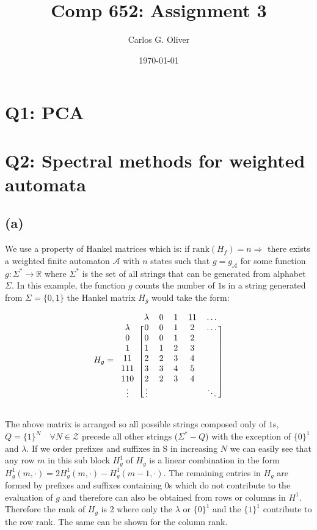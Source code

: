 \documentclass[11pt]{amsart}
\title{Comp 652: Assignment 3}
\author{Carlos G. Oliver}
\date{\today}                                           %
\begin{document}
\maketitle

\section{Q1: PCA}

\section{Q2: Spectral methods for weighted automata}
\subsection{(a)}

We use a property of Hankel matrices which is: if $\text{rank}(H_f) = n \Rightarrow$ there exists a weighted finite automaton $\mathcal{A}$  with $n$ states such that $g = g_{\mathcal{A}}$ for some function $g : \Sigma^{*} \rightarrow \mathbb{R}$ where $\Sigma^{*}$ is the set of all strings that can be generated from alphabet $\Sigma$. In this example, the function $g$ counts the number of $1$s in a string generated from $\Sigma = \{0, 1\}$ the Hankel matrix $H_g$ would take the form: 


 
\[
H_g = \begin{blockarray}{cccccc}
\def\ra{\color{red}\ba}
 & \lambda & 0 & 1 & 11 & \hdots \\
\begin{block}{c[ccccc]}
  \lambda & 0 & 0 & 1 & 2 & \hdots \\
  0 & 0 & 0 & 1 & 2 &  \\
  1 & 1 & 1 & 2 & 3 &  \\
  11 & 2 & 2 & 3 & 4 &  \\
  111 & 3 & 3 & 4 & 5 &  \\
  110 & 2 & 2 & 3 & 4 &  \\
  \vdots & \vdots &  &  &  & \ddots \\
\end{block}
\end{blockarray}
\label{mat:h_1}
 \]

The above matrix is arranged so all possible strings composed only of $1$s, $Q = \{1\}^N \quad \forall N \in \mathcal{Z}$ precede all other strings ($\Sigma^{*} - Q$) with the exception of $\{0\}^1$ and $\lambda$. If we order prefixes and suffixes in S in increasing $N$ we can easily see that any row $m$ in this sub block $H^{1}_g$ of $H_g$ is a linear combination in the form $H^{1}_g(m, \cdot) = 2H^{1}_g(m, \cdot) - H^{1}_g(m-1, \cdot)$. The remaining entries in $H_g$ are formed by prefixes and suffixes containing $0$s which do not contribute to the evaluation of $g$ and therefore can also be obtained from rows or columns in $H^{1}$. Therefore the rank of $H_g$ is 2 where only the $\lambda$ or $\{0\}^1$ and the $\{1\}^1$ contribute to the row rank. The same can be shown for the column rank.
\end{document}
